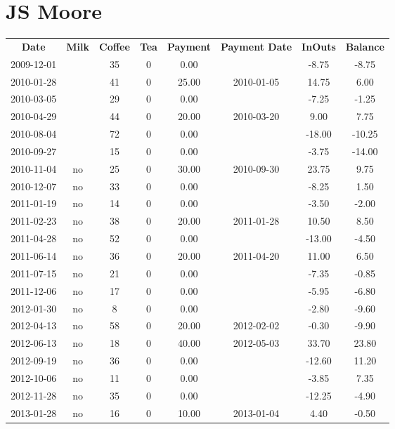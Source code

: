 \section{JS Moore}

\begin{center}
\begin{tabular}{cccccccc}
\textbf{Date} & \textbf{Milk} & \textbf{Coffee} & \textbf{Tea} & \textbf{Payment} & \textbf{Payment Date} & \textbf{InOuts} & \textbf{Balance} \\
2009-12-01 &  & 35 & 0 &  0.00 &  &  -8.75 &  -8.75\\ 
2010-01-28 &  & 41 & 0 & 25.00 & 2010-01-05 &  14.75 &   6.00\\ 
2010-03-05 &  & 29 & 0 &  0.00 &  &  -7.25 &  -1.25\\ 
2010-04-29 &  & 44 & 0 & 20.00 & 2010-03-20 &   9.00 &   7.75\\ 
2010-08-04 &  & 72 & 0 &  0.00 &  & -18.00 & -10.25\\ 
2010-09-27 &  & 15 & 0 &  0.00 &  &  -3.75 & -14.00\\ 
2010-11-04 & no & 25 & 0 & 30.00 & 2010-09-30 &  23.75 &   9.75\\ 
2010-12-07 & no & 33 & 0 &  0.00 &  &  -8.25 &   1.50\\ 
2011-01-19 & no & 14 & 0 &  0.00 &  &  -3.50 &  -2.00\\ 
2011-02-23 & no & 38 & 0 & 20.00 & 2011-01-28 &  10.50 &   8.50\\ 
2011-04-28 & no & 52 & 0 &  0.00 &  & -13.00 &  -4.50\\ 
2011-06-14 & no & 36 & 0 & 20.00 & 2011-04-20 &  11.00 &   6.50\\ 
2011-07-15 & no & 21 & 0 &  0.00 &  &  -7.35 &  -0.85\\ 
2011-12-06 & no & 17 & 0 &  0.00 &  &  -5.95 &  -6.80\\ 
2012-01-30 & no &  8 & 0 &  0.00 &  &  -2.80 &  -9.60\\ 
2012-04-13 & no & 58 & 0 & 20.00 & 2012-02-02 &  -0.30 &  -9.90\\ 
2012-06-13 & no & 18 & 0 & 40.00 & 2012-05-03 &  33.70 &  23.80\\ 
2012-09-19 & no & 36 & 0 &  0.00 &  & -12.60 &  11.20\\ 
2012-10-06 & no & 11 & 0 &  0.00 &  &  -3.85 &   7.35\\ 
2012-11-28 & no & 35 & 0 &  0.00 &  & -12.25 &  -4.90\\ 
2013-01-28 & no & 16 & 0 & 10.00 & 2013-01-04 &   4.40 &  -0.50
\end{tabular}
\end{center}

